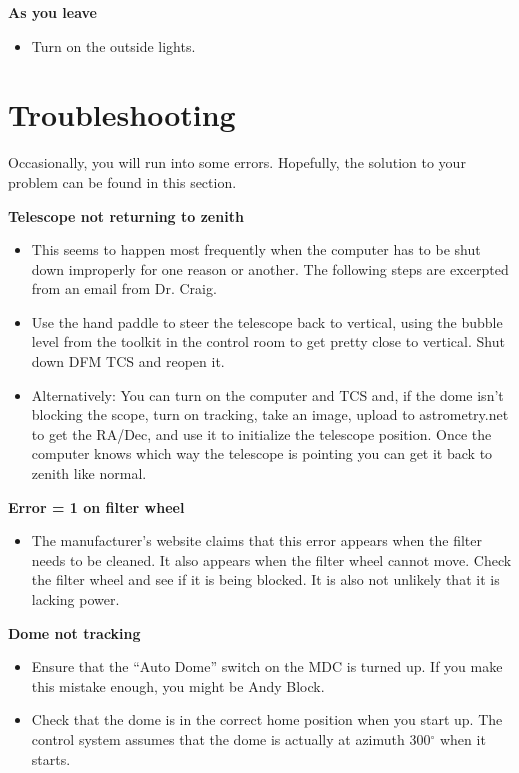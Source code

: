 \documentclass[letterpaper, 12pt]{report}
\begin{document}
\large \textbf{As you leave}
\begin{itemize}
	\item Turn on the outside lights.
\end{itemize}

\newpage
\chapter{Troubleshooting}
Occasionally, you will run into some errors. Hopefully, the solution to your problem can be found in this section.

\noindent\textbf{Telescope not returning to zenith}
\begin{itemize}
	\item This seems to happen most frequently when the computer has to be shut down improperly for one reason or another. The following steps are excerpted from an email from Dr. Craig.
	\item Use the hand paddle to steer the telescope back to vertical, using the bubble level from the toolkit in the control room to get pretty close to vertical. Shut down DFM TCS and reopen it.
	\item Alternatively: You can turn on the computer and TCS and, if the dome isn’t blocking the scope, turn on tracking, take an image, upload to astrometry.net to get the RA/Dec, and use it to initialize the telescope position. Once the computer knows which way the telescope is pointing you can get it back to zenith like normal.
\end{itemize}

\noindent\textbf{Error = 1 on filter wheel}
\begin{itemize}
	\item The manufacturer's website claims that this error appears when the filter needs to be cleaned. It also appears when the filter wheel cannot move. Check the filter wheel and see if it is being blocked. It is also not unlikely that it is lacking power.
\end{itemize}

\noindent \textbf{Dome not tracking}
\begin{itemize}
	\item Ensure that the ``Auto Dome'' switch on the MDC is turned up. If you make this mistake enough, you might be Andy Block.
	\item Check that the dome is in the correct home position when you start up. The control system assumes that the dome is actually at azimuth 300$^\circ$ when it starts.
\end{itemize}
\end{document}
